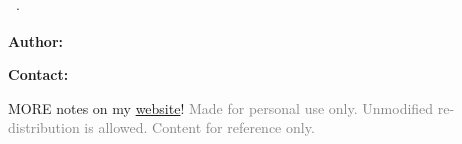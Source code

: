 \begin{titlepage}
    \null\vfill %

    \centering
    \Huge\textbf{\documentname}

    \vspace{0.1cm}
    \Large\textbf{\documenttype\ $\cdot$ \documentdate}

    \vspace{1cm}
    \normalsize\textbf{Author:} \documentauthor

    \normalsize\textbf{Contact:} \documentauthorcontact

    MORE notes on my \href{https://jaxtam.dev/notes}{website}!
    \vfill %
    \textcolor{gray}{Made for personal use only. Unmodified re-distribution is allowed. Content for reference only.}
\end{titlepage}
